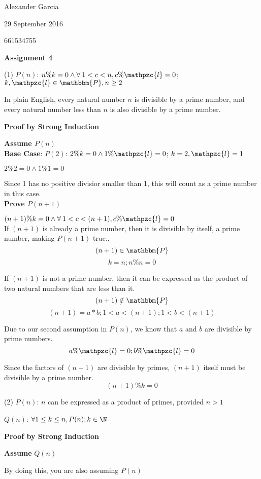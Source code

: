 \documentclass[]{article}
\def\AND{\wedge}
\begin{document}
Alexander Garcia

29 September 2016

661534755

\centerline{\bf \Large Assignment 4}

\medskip

\noindent (1) $P(n)$: $n\%k = 0 \AND \forall \: 1 < c < n, c\% \mathpzc{l} = 0$; $k, \mathpzc{l} \in \mathbbm{P}, n \geq 2$

In plain English, every natural number $n$ is divisible by a prime number, and every natural number less than $n$ is also divisible by a prime number.

\textbf{Proof by Strong Induction}

\textbf{Assume $P(n)$} \\

\textbf{Base Case}: $P(2)$: $2\%k = 0 \AND 1\% \mathpzc{l} = 0$; $k = 2, \mathpzc{l} = 1$

$2\%2 = 0 \AND 1\%1 = 0$

Since 1 has no positive divisior smaller than 1, this will count as a prime number in this case. \\

\textbf{Prove $P(n+1)$}

$(n+1) \% k = 0 \AND \forall \: 1 < c < (n+1), c \% \mathpzc{l} = 0$ \\

If $(n+1)$ is already a prime number, then it is divisible by itself, a prime number, making $P(n+1)$ true.. $$(n+1) \in \mathbbm{P}$$
$$k = n; n \% n = 0$$

If $(n+1)$ is not a prime number, then it can be expressed as the product of two natural numbers that are less than it. $$(n+1) \notin \mathbbm{P}$$
$$(n+1) = a*b; 1 < a < (n+1); 1 < b < (n+1)$$

Due to our second assumption in $P(n)$, we know that $a$ and $b$ are divisible by prime numbers.
$$a \% \mathpzc{l} = 0; b \% \mathpzc{l} = 0$$

Since the factors of $(n+1)$ are divisible by primes, $(n+1)$ itself must be divisible by a prime number.
$$(n+1)\% k = 0$$

\noindent (2) $P(n)$: $n$ can be expressed as a product of primes, provided $n > 1$

$Q(n)$: $\forall 1\leq k \leq n, P(n); k \in \N$

\textbf{Proof by Strong Induction}

\textbf{Assume} $Q(n)$

By doing this, you are also assuming $P(n)$ \\
\end{document}
